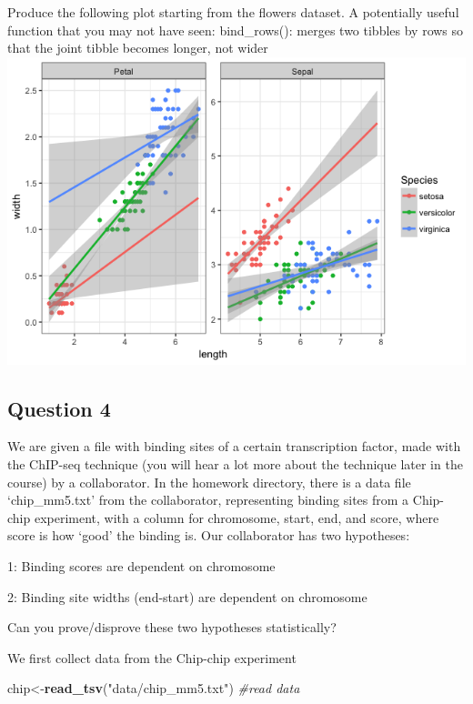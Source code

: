 \documentclass[]{article}
\newenvironment{Shaded}{\begin{snugshade}}{\end{snugshade}}
\newcommand{\KeywordTok}[1]{\textcolor[rgb]{0.13,0.29,0.53}{\textbf{#1}}}
\newcommand{\StringTok}[1]{\textcolor[rgb]{0.31,0.60,0.02}{#1}}
\newcommand{\CommentTok}[1]{\textcolor[rgb]{0.56,0.35,0.01}{\textit{#1}}}
\newcommand{\NormalTok}[1]{#1}
\begin{document}
Produce the following plot starting from the flowers dataset. A
potentially useful function that you may not have seen: bind\_rows():
merges two tibbles by rows so that the joint tibble becomes longer, not
wider \includegraphics{example.png}

\subsection{Question 4}\label{question-4}

We are given a file with binding sites of a certain transcription
factor, made with the ChIP-seq technique (you will hear a lot more about
the technique later in the course) by a collaborator. In the homework
directory, there is a data file `chip\_mm5.txt' from the collaborator,
representing binding sites from a Chip-chip experiment, with a column
for chromosome, start, end, and score, where score is how `good' the
binding is. Our collaborator has two hypotheses:

1: Binding scores are dependent on chromosome

2: Binding site widths (end-start) are dependent on chromosome

Can you prove/disprove these two hypotheses statistically?

We first collect data from the Chip-chip experiment

\begin{Shaded}
\begin{Highlighting}[]
\NormalTok{chip<-}\KeywordTok{read_tsv}\NormalTok{(}\StringTok{"data/chip_mm5.txt"}\NormalTok{) }\CommentTok{#read data}
\end{Highlighting}
\end{Shaded}
\end{document}
